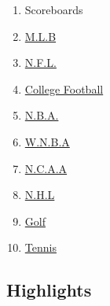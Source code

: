 \begin{enumerate}
\def\labelenumi{\arabic{enumi}.}
\tightlist
\item
  Scoreboards
\item
  \href{https://nytimes.stats.com/mlb/scoreboard.asp}{M.L.B}
\item
  \href{https://nytimes.stats.com/fb/scoreboard.asp}{N.F.L.}
\item
  \href{https://nytimes.stats.com/cfb/scoreboard.asp}{College Football}
\item
  \href{https://nytimes.stats.com/nba/scoreboard.asp}{N.B.A.}
\item
  \href{https://nytimes.stats.com/wnba/scoreboard.asp}{W.N.B.A}
\item
  \href{https://nytimes.stats.com/cbk/scoreboard.asp}{N.C.A.A}
\item
  \href{https://nytimes.stats.com/nhl/scoreboard.asp}{N.H.L}
\item
  \href{https://nytimes.stats.com/golf/final.asp}{Golf}
\item
  \href{https://nytimes.stats.com/tennis/scoreboard.asp}{Tennis}
\end{enumerate}

\hypertarget{highlights}{%
\subsection{Highlights}\label{highlights}}

